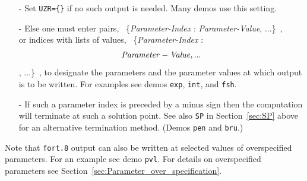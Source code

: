 \documentclass[12pt]{report}
\begin{document}
\begin{itemize}
\item[-]
 Set {\tt UZR=\{\}} if no such output is needed. Many demos use this setting.
\item[-]
 Else one must enter pairs,
            ~\{{\it Parameter-Index} : {\it Parameter-Value}, ...\}~,\\
 or indices with lists of values,
            ~\{{\it Parameter-Index} : \[{\it Parameter-Value}, ...\], ...\}~,
 to designate the parameters and the parameter
 values at which output is to be written.
 For examples see demos {\tt exp}, {\tt int}, and {\tt fsh}.
\item[-]
 If such a parameter index is preceded by a minus sign then the computation will
 terminate at such a solution point. See also \texttt{SP} in
 Section~\ref{sec:SP} above for an alternative termination method.
 (Demos {\tt pen} and {\tt bru}.)
\end{itemize}

Note that {\tt fort.8} output can also be written at selected values of 
overspecified parameters. For an example see demo {\tt pvl}.
For details on overspecified parameters see 
Section~\ref{sec:Parameter_over_specification}.
\end{document}
